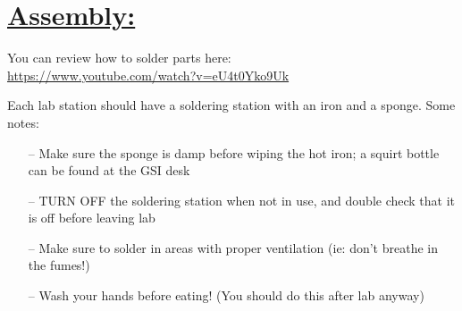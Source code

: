 \documentclass{tufte-handout}
\begin{document}
\clearpage

\section{\underline{\textbf{Assembly:}}}\label{sec:page-layout}
\noindent You can review how to solder parts here:\\ \url{https://www.youtube.com/watch?v=eU4t0Yko9Uk}

\medskip
\noindent Each lab station should have a soldering station with an iron and a sponge. Some notes:
\begin{itemize}
\item[--] Make sure the sponge is damp before wiping the hot iron; a squirt bottle can be found at the GSI desk
\item[--] TURN OFF the soldering station when not in use, and double check that it is off before leaving lab
\item[--] Make sure to solder in areas with proper ventilation (ie: don't breathe in the fumes!)
\item[--] Wash your hands before eating! (You should do this after lab anyway)
\end{itemize}
\end{document}
